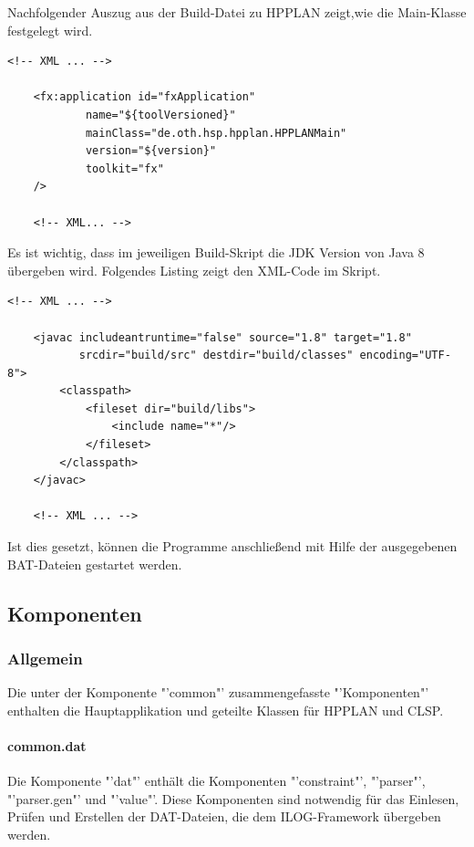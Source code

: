 \documentclass[12pt,a4paper, listof=entryprefix, bibliography=totocnumbered,toc=listofnumbered,lof=listofnumbered]{scrartcl}
\begin{document}
Nachfolgender Auszug aus der Build-Datei zu HPPLAN zeigt,wie die Main-Klasse festgelegt wird.

\begin{lstlisting}[caption= Ant Build-Skript HPPLAN, label=lst:code1]
	<!-- XML ... -->
	
	<fx:application id="fxApplication"
			name="${toolVersioned}"
			mainClass="de.oth.hsp.hpplan.HPPLANMain"
			version="${version}"
			toolkit="fx"
	/>
	
	<!-- XML... -->
\end{lstlisting}

Es ist wichtig, dass im jeweiligen Build-Skript die JDK Version von Java 8 übergeben wird. Folgendes Listing zeigt den XML-Code im Skript.

\begin{lstlisting}[caption= Ant Build-Skript mit Angabe der JDK Version, label=lst:code2]
	<!-- XML ... -->
	
	<javac includeantruntime="false" source="1.8" target="1.8" 
		   srcdir="build/src" destdir="build/classes" encoding="UTF-8">
		<classpath>
			<fileset dir="build/libs">
				<include name="*"/>
			</fileset>
		</classpath>
	</javac>
	
	<!-- XML ... -->
\end{lstlisting}

Ist dies gesetzt, können die Programme anschließend mit Hilfe der ausgegebenen BAT-Dateien gestartet werden.


\subsection{Komponenten}


\subsubsection{Allgemein}

Die unter der Komponente "'common"' zusammengefasste "'Komponenten"' enthalten die Hauptapplikation und geteilte Klassen für HPPLAN und CLSP.

\paragraph{common.dat}
Die Komponente "'dat"' enthält die Komponenten "'constraint"', "'parser"', "'parser.gen"' und "'value"'. Diese Komponenten sind notwendig für das Einlesen, Prüfen und Erstellen der DAT-Dateien, die dem ILOG-Framework übergeben werden.
\end{document}
